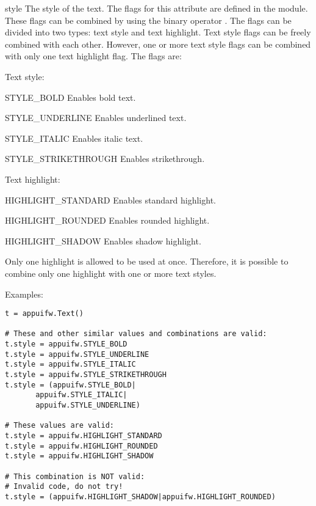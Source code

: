 \begin{memberdesc}[Text]{style}
The style of the text. The flags for this attribute are defined in the 
 module. These flags can be combined by using the binary 
operator \code{|}. The flags can be divided into two types: text style 
and text highlight. Text style flags can be freely combined with each other. 
However, one or more text style flags can be combined with only one text 
highlight flag. The flags are:

Text style:

\begin{datadesc}{STYLE_BOLD} 
Enables bold text.
\end{datadesc}

\begin{datadesc}{STYLE_UNDERLINE}
Enables underlined text.
\end{datadesc}

\begin{datadesc}{STYLE_ITALIC} 
Enables italic text.
\end{datadesc}

\begin{datadesc}{STYLE_STRIKETHROUGH } 
Enables strikethrough.
\end{datadesc}

Text highlight:

\begin{datadesc}{HIGHLIGHT_STANDARD}
Enables standard highlight.
\end{datadesc}

\begin{datadesc}{HIGHLIGHT_ROUNDED}
Enables rounded highlight.
\end{datadesc}

\begin{datadesc}{HIGHLIGHT_SHADOW}
Enables shadow highlight.
\end{datadesc}

Only one highlight is allowed to be used at once. Therefore, it is possible 
to combine only one highlight with one or more text styles.

Examples:
\begin{verbatim}
t = appuifw.Text()

# These and other similar values and combinations are valid:
t.style = appuifw.STYLE_BOLD
t.style = appuifw.STYLE_UNDERLINE
t.style = appuifw.STYLE_ITALIC
t.style = appuifw.STYLE_STRIKETHROUGH
t.style = (appuifw.STYLE_BOLD|
	   appuifw.STYLE_ITALIC|
	   appuifw.STYLE_UNDERLINE)

# These values are valid:
t.style = appuifw.HIGHLIGHT_STANDARD
t.style = appuifw.HIGHLIGHT_ROUNDED
t.style = appuifw.HIGHLIGHT_SHADOW

# This combination is NOT valid:
# Invalid code, do not try!
t.style = (appuifw.HIGHLIGHT_SHADOW|appuifw.HIGHLIGHT_ROUNDED)
\end{verbatim}
\end{memberdesc}


